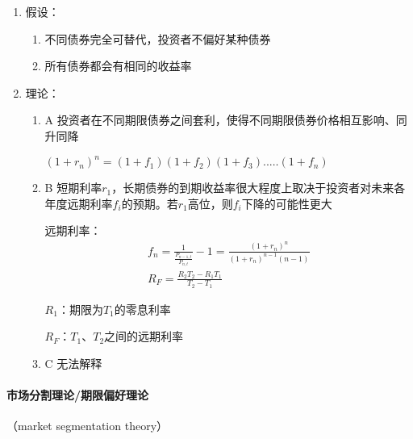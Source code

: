 \documentclass[12pt]{book}
\begin{document}
\begin{enumerate}[1.]
    \item 假设：
          \begin{enumerate}[(1)]
              \item 不同债券完全可替代，投资者不偏好某种债券
              \item 所有债券都会有相同的收益率
          \end{enumerate}
    \item 理论：
          \begin{enumerate}[(1)]
              \item A 投资者在不同期限债券之间套利，使得不同期限债券价格相互影响、同升同降
                    \par $\left(1+r_n\right)^n=\left(1+f_1\right)\left(1+f_2\right)\left(1+f_3\right)..\ldots\left(1+f_n\right)$
              \item B 短期利率$r_1$，长期债券的到期收益率很大程度上取决于投资者对未来各年度远期利率$f_i$的预期。若$r_1$高位，则$f_i$下降的可能性更大
                    \par 远期利率：
                    \begin{gather*}
                        f_n = \frac{1}{\frac{P_{n-1,t}}{P_{n,t}}}-1=\frac{\left(1+r_n\right)^n}{\left(1+r_n\right)^{n-1}(n-1)}\\
                        R_F = \frac{R_2T_2-R_1T_1}{T_2-T_1}
                    \end{gather*}
                    \par $R_1$：期限为$T_1$的零息利率
                    \par $R_F$：$T_1$、$T_2$之间的远期利率
              \item C 无法解释
          \end{enumerate}
\end{enumerate}


\paragraph{市场分割理论/期限偏好理论}

（market segmentation theory）
\end{document}
